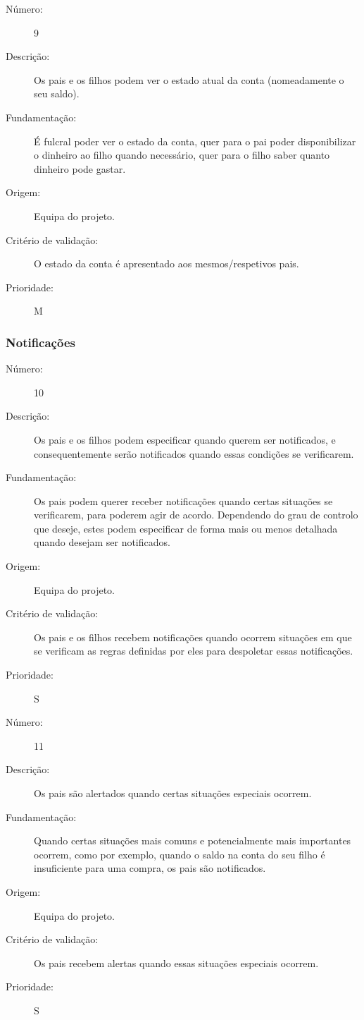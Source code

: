 \documentclass[12pt,a4paper]{article}
\begin{document}
            \begin{description}
        \item[Número:]9
        \item[Descrição:]Os pais e os filhos podem ver o estado atual da conta (nomeadamente o seu saldo).
        \item[Fundamentação:]É fulcral poder ver o estado da conta, quer para o pai poder disponibilizar o dinheiro ao filho quando necessário, quer para o filho saber quanto dinheiro pode gastar.
        \item[Origem:]Equipa do projeto.
        \item[Critério de validação:]O estado da conta é apresentado aos mesmos/respetivos pais.
        \item[Prioridade:]M
      \end{description}

    \subsubsection{Notificações}  

            \begin{description}
        \item[Número:]10
        \item[Descrição:]Os pais e os filhos podem especificar quando querem ser notificados, e consequentemente serão notificados quando essas condições se verificarem.
        \item[Fundamentação:]Os pais podem querer receber notificações quando certas situações se verificarem, para poderem agir de acordo. Dependendo do grau de controlo que deseje, estes podem especificar de forma mais ou menos detalhada quando desejam ser notificados.
        \item[Origem:]Equipa do projeto.
        \item[Critério de validação:]Os pais e os filhos recebem notificações quando ocorrem situações em que se verificam as regras definidas por eles para despoletar essas notificações.
        \item[Prioridade:]S
      \end{description}
\vspace{0.5cm}
     \begin{description}
        \item[Número:]11
        \item[Descrição:]Os pais são alertados quando certas situações especiais ocorrem.
        \item[Fundamentação:]Quando certas situações mais comuns e potencialmente mais importantes ocorrem, como por exemplo, quando o saldo na conta do seu filho é insuficiente para uma compra, os pais são notificados.
        \item[Origem:]Equipa do projeto.
        \item[Critério de validação:]Os pais recebem alertas quando essas situações especiais ocorrem.
        \item[Prioridade:]S
      \end{description}
\end{document}
